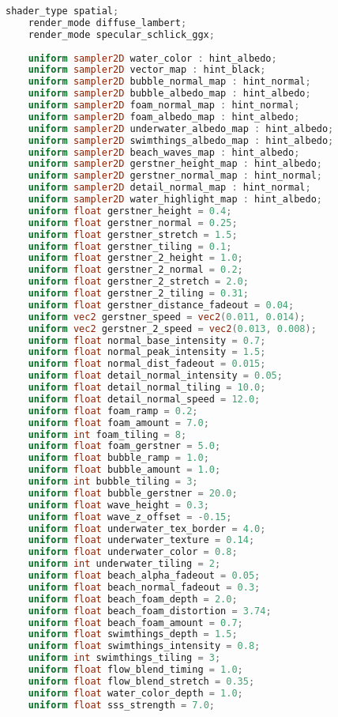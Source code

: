 \label{an:codigo-fonte-agua-godot}



\begin{lstlisting}[language=GLSL, caption={\label{cf:agua} \textit{Shader} de efeito de água na Unity}]
	shader_type spatial;
	render_mode diffuse_lambert;
	render_mode specular_schlick_ggx;
	
	uniform sampler2D water_color : hint_albedo;
	uniform sampler2D vector_map : hint_black;
	uniform sampler2D bubble_normal_map : hint_normal;
	uniform sampler2D bubble_albedo_map : hint_albedo;
	uniform sampler2D foam_normal_map : hint_normal;
	uniform sampler2D foam_albedo_map : hint_albedo;
	uniform sampler2D underwater_albedo_map : hint_albedo;
	uniform sampler2D swimthings_albedo_map : hint_albedo;
	uniform sampler2D beach_waves_map : hint_albedo;
	uniform sampler2D gerstner_height_map : hint_albedo;
	uniform sampler2D gerstner_normal_map : hint_normal;
	uniform sampler2D detail_normal_map : hint_normal;
	uniform sampler2D water_highlight_map : hint_albedo;
	uniform float gerstner_height = 0.4;
	uniform float gerstner_normal = 0.25;
	uniform float gerstner_stretch = 1.5;
	uniform float gerstner_tiling = 0.1;
	uniform float gerstner_2_height = 1.0;
	uniform float gerstner_2_normal = 0.2;
	uniform float gerstner_2_stretch = 2.0;
	uniform float gerstner_2_tiling = 0.31;
	uniform float gerstner_distance_fadeout = 0.04;
	uniform vec2 gerstner_speed = vec2(0.011, 0.014);
	uniform vec2 gerstner_2_speed = vec2(0.013, 0.008);	
	uniform float normal_base_intensity = 0.7;
	uniform float normal_peak_intensity = 1.5;
	uniform float normal_dist_fadeout = 0.015;
	uniform float detail_normal_intensity = 0.05;
	uniform float detail_normal_tiling = 10.0;
	uniform float detail_normal_speed = 12.0;
	uniform float foam_ramp = 0.2;
	uniform float foam_amount = 7.0;
	uniform int foam_tiling = 8;
	uniform float foam_gerstner = 5.0;
	uniform float bubble_ramp = 1.0;
	uniform float bubble_amount = 1.0;
	uniform int bubble_tiling = 3;
	uniform float bubble_gerstner = 20.0;
	uniform float wave_height = 0.3;
	uniform float wave_z_offset = -0.15;
	uniform float underwater_tex_border = 4.0;
	uniform float underwater_texture = 0.14;
	uniform float underwater_color = 0.8;
	uniform int underwater_tiling = 2;
	uniform float beach_alpha_fadeout = 0.05;
	uniform float beach_normal_fadeout = 0.3;
	uniform float beach_foam_depth = 2.0;
	uniform float beach_foam_distortion = 3.74;
	uniform float beach_foam_amount = 0.7;
	uniform float swimthings_depth = 1.5;
	uniform float swimthings_intensity = 0.8;
	uniform int swimthings_tiling = 3;
	uniform float flow_blend_timing = 1.0;
	uniform float flow_blend_stretch = 0.35;
	uniform float water_color_depth = 1.0;
	uniform float sss_strength = 7.0;
	

\end{lstlisting}
